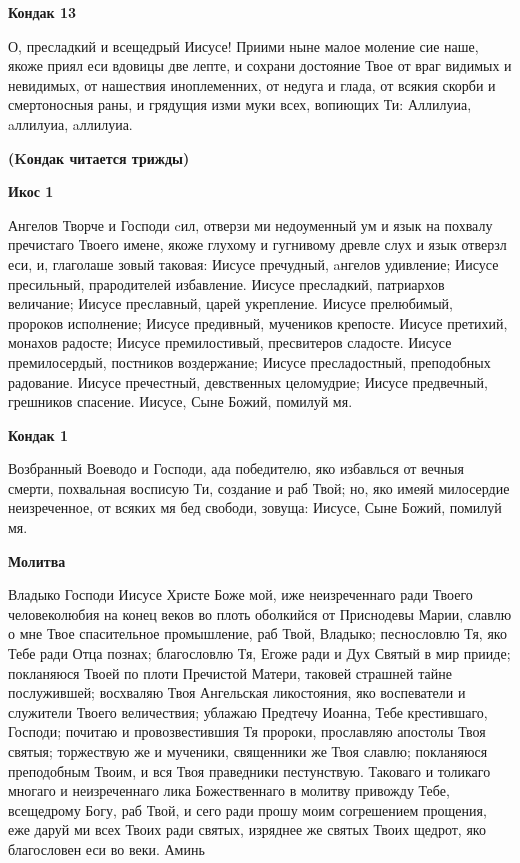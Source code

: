 \medskip
\bfseries Кондак 13\normalfont{}


О,
пресладкий и всещедрый Иисусе! Приими ныне малое моление сие наше, якоже приял еси вдовицы две лепте, и сохрани достояние Твое от враг видимых и невидимых, от нашествия иноплеменних, от недуга и глада, от всякия скорби и смертоносныя раны, и грядущия изми муки всех, вопиющих Ти: Аллилуиа, aллилуиа, aллилуиа.


\medskip
\bfseries (Kондак читается трижды)\normalfont{}


\medskip
\bfseries Икос 1\normalfont{}


Ангелов
Творче и Господи cил, отверзи ми недоуменный ум и язык на похвалу пречистаго Твоего имене, якоже глухому и гугнивому древле слух и язык отверзл еси, и, глаголаше зовый таковая: Иисусе пречудный, aнгелов удивление; Иисусе пресильный, прародителей избавление. Иисусе пресладкий, патриархов величание; Иисусе преславный, царей укрепление. Иисусе прелюбимый, пророков исполнение; Иисусе предивный, мучеников крепосте. Иисусе претихий, монахов радосте; Иисусе премилостивый, пресвитеров сладосте. Иисусе премилосердый, постников воздержание; Иисусе пресладостный, преподобных радование. Иисусе пречестный, девственных целомудрие; Иисусе предвечный, грешников спасение. Иисусе, Сыне Божий, помилуй мя.


\medskip
\bfseries Кондак 1\normalfont{}


Возбранный
Воеводо и Господи, ада победителю, яко избавлься от вечныя смерти, похвальная восписую Ти, создание и раб Твой; но, яко имеяй милосердие неизреченное, от всяких мя бед свободи, зовуща: Иисусе, Сыне Божий, помилуй мя.


\medskip
\bfseries Молитва\normalfont{}


Владыко
Господи Иисусе Христе Боже мой, иже неизреченнаго ради Твоего человеколюбия на конец веков во плоть оболкийся от Приснодевы Марии, славлю о мне Твое спасительное промышление, раб Твой, Владыко;
песнословлю Тя, яко Тебе ради Отца познах; благословлю Тя, Егоже ради и Дух Святый в мир прииде; покланяюся Твоей по плоти Пречистой Матери, таковей страшней тайне послужившей; восхваляю Твоя Ангельская ликостояния, яко воспеватели и служители Твоего величествия; ублажаю Предтечу Иоанна, Тебе крестившаго, Господи; почитаю и провозвестившия Тя пророки, прославляю апостолы Твоя святыя; торжествую же и мученики, священники же Твоя славлю; покланяюся преподобным Твоим, и вся Твоя праведники пестунствую. Таковаго и толикаго многаго и неизреченнаго лика Божественнаго в молитву привожду Тебе, всещедрому Богу, раб Твой, и сего ради прошу моим согрешением прощения, еже даруй ми всех Твоих ради святых, изряднее же святых Твоих щедрот, яко благословен еси во веки. Аминь

